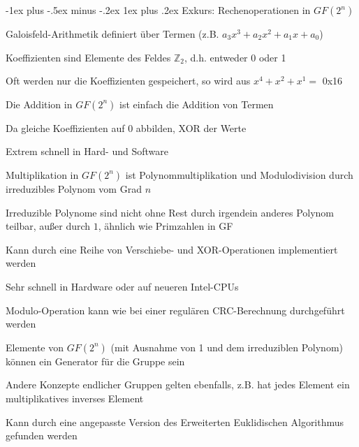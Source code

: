 \documentclass[a4paper]{article}
\makeatletter
\renewcommand{\subsubsection}{\@startsection{subsubsection}{3}{0mm}%
 {-1ex plus -.5ex minus -.2ex}%
 {1ex plus .2ex}%
 {\normalfont\small\bfseries}}
\makeatother
\begin{document}
\begin{multicols}{3}
      \subsubsection{Exkurs: Rechenoperationen in $GF(2^n)$}
      \begin{itemize*}
            \item Galoisfeld-Arithmetik definiert über Termen (z.B. $a_3x^3+a_2x^2+a_1x+a_0$)
            \item Koeffizienten sind Elemente des Feldes $\mathbb{Z}_2$, d.h. entweder 0 oder 1
            \item Oft werden nur die Koeffizienten gespeichert, so wird aus $x^4+x^2 +x^1=$ 0x16
            \item Die Addition in $GF(2^n)$ ist einfach die Addition von Termen
            \begin{itemize*}
                  \item Da gleiche Koeffizienten auf 0 abbilden, XOR der Werte
                  \item Extrem schnell in Hard- und Software
            \end{itemize*}
            \item Multiplikation in $GF(2^n)$ ist Polynommultiplikation und Modulodivision durch irreduzibles Polynom vom Grad $n$
            \begin{itemize*}
                  \item Irreduzible Polynome sind nicht ohne Rest durch irgendein anderes Polynom teilbar, außer durch $1$, ähnlich wie Primzahlen in GF
                  \item Kann durch eine Reihe von Verschiebe- und XOR-Operationen implementiert werden
                  \item Sehr schnell in Hardware oder auf neueren Intel-CPUs
                  \item Modulo-Operation kann wie bei einer regulären CRC-Berechnung durchgeführt werden
            \end{itemize*}
            \item Elemente von $GF(2^n)$ (mit Ausnahme von 1 und dem irreduziblen Polynom) können ein Generator für die Gruppe sein
            \item Andere Konzepte endlicher Gruppen gelten ebenfalls, z.B. hat jedes Element ein multiplikatives inverses Element
            \item Kann durch eine angepasste Version des Erweiterten Euklidischen Algorithmus gefunden werden
      \end{itemize*}


\end{multicols}
\end{document}
